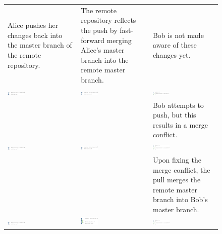 \begin{figure}[htbp]
\begin{tabulary}{\textwidth}{LLL}
    \tiny{Alice pushes her changes back into the master branch of the remote
    repository.} &
    \tiny{The remote repository reflects the push by fast-forward merging
    Alice's master branch into the remote master branch.} &
    \tiny{Bob is not made aware of these changes yet.} \\

    \includegraphics[width=0.27\textwidth]{Figures/background/foxtrot/alice_3.png} &
    \includegraphics[width=0.27\textwidth]{Figures/background/foxtrot/remote_2.png} &
    \includegraphics[width=0.27\textwidth]{Figures/background/foxtrot/bob_3.png} \\

    &
    &
    \tiny{Bob attempts to push, but this results in a merge conflict.}
    \\

    \includegraphics[width=0.27\textwidth]{Figures/background/foxtrot/alice_3.png} &
    \includegraphics[width=0.27\textwidth]{Figures/background/foxtrot/remote_2.png} &
    \includegraphics[width=0.27\textwidth]{Figures/background/foxtrot/bob_4.png} \\

    &
    &
    \tiny{Upon fixing the merge conflict, the pull merges the remote master
    branch into Bob's master branch.}
    \\

    \includegraphics[width=0.27\textwidth]{Figures/background/foxtrot/alice_3.png} &
    \includegraphics[width=0.27\textwidth]{Figures/background/foxtrot/remote_3.png} &
    \includegraphics[width=0.27\textwidth]{Figures/background/foxtrot/bob_4.png} \\


\end{tabulary}
\end{figure}
